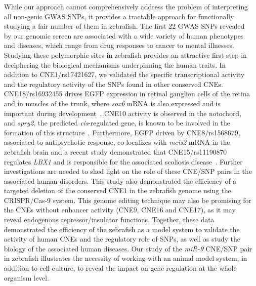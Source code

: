 While our approach cannot comprehensively address the problem of
interpreting all non-genic GWAS SNPs, it provides a tractable approach
for functionally studying a fair number of them in zebrafish. The first
22 GWAS SNPs revealed by our genomic screen are associated with a wide
variety of human phenotypes and diseases, which range from drug
responses to cancer to mental illnesses. Studying these polymorphic
sites in zebrafish provides an attractive first step in deciphering the
biological mechanisms underpinning the human traits. In addition to
CNE1/rs17421627, we validated the specific transcriptional activity and
the regulatory activity of the SNPs found in other conserved CNEs.
CNE18/rs16932455 drives EGFP expression in retinal ganglion cells of the
retina and in muscles of the trunk, where \emph{sox6} mRNA is also
expressed and is important during development~\citep{Jackson:2015gu}. CNE10 activity is
observed in the notochord, and \emph{spry2}, the predicted
\emph{cis}-regulated gene, is known to be involved in the formation of
this structure~\citep{Sivak:2005by}.
Furthermore, EGFP driven by CNE8/rs1568679, associated to antipsychotic
response, co-localizes with \emph{meis2} mRNA in the zebrafish brain and
a recent study demonstrated that CNE15/rs11190870 regulates \emph{LBX1}
and is responsible for the associated scoliosis disease~\citep{Guo:2016ho}. Further investigations
are needed to shed light on the role of these CNE/SNP pairs in the
associated human disorders. This study also demonstrated the efficiency
of a targeted deletion of the conserved CNE1 in the zebrafish genome
using the CRISPR/Cas-9 system. This genome editing technique may also be
promising for the CNEs without enhancer activity (CNE9, CNE16 and
CNE17), as it may reveal endogenous repressor/insulator functions.
Together, these data demonstrated the efficiency of the zebrafish as a
model system to validate the activity of human CNEs and the regulatory
role of SNPs, as well as study the biology of the associated human
diseases. Our study of the \emph{miR-9} CNE/SNP pair in zebrafish
illustrates the necessity of working with an animal model system, in
addition to cell culture, to reveal the impact on gene regulation at the
whole organism level.

